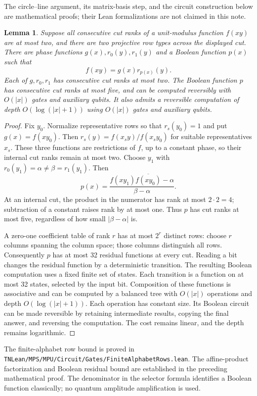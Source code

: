 \documentclass[11pt]{article}
\newtheorem{lemma}{Lemma}
\begin{document}
The circle--line argument, its matrix-basis step, and the circuit
construction below are mathematical proofs; their Lean formalizations
are not claimed in this note.

\begin{lemma}\label{lem:selector}
Suppose all consecutive cut ranks of a unit-modulus function $f(xy)$ are
at most two, and there are two projective row types across the displayed
cut. There are phase functions $g(x),r_0(y),r_1(y)$ and a Boolean function
$p(x)$ such that
\[
 f(xy)=g(x)r_{p(x)}(y).
\]
Each of $g,r_0,r_1$ has consecutive cut ranks at most two.
The Boolean function $p$ has consecutive cut ranks at most five, and
can be computed reversibly with $O(|x|)$ gates and auxiliary qubits.
It also admits a reversible computation of depth $O(\log(|x|+1))$
using $O(|x|)$ gates and auxiliary qubits.
\end{lemma}
\begin{proof}
Fix $y_0$. Normalize representative rows so that $r_s(y_0)=1$ and put
$g(x)=f(xy_0)$. Then $r_s(y)=f(x_s y)/f(x_s y_0)$ for suitable
representatives $x_s$. These three functions are restrictions of $f$,
up to a constant phase, so their internal cut ranks remain at most two.
Choose $y_1$ with $r_0(y_1)=\alpha\ne\beta=r_1(y_1)$. Then
\[
 p(x)=\frac{f(xy_1)\overline{f(xy_0)}-\alpha}{\beta-\alpha}.
\]
At an internal cut, the product in the numerator has rank at most
$2\cdot2=4$; subtraction of a constant raises rank by at most one.
Thus $p$ has cut ranks at most five, regardless of how small
$|\beta-\alpha|$ is.

A zero-one coefficient table of rank $r$ has at most $2^r$ distinct rows:
choose $r$ columns spanning the column space; those columns distinguish
all rows. Consequently $p$ has at most 32 residual functions at every
cut. Reading a bit changes the residual function by a deterministic
transition. The resulting Boolean computation uses a fixed finite set
of states. Each transition is a function on at most 32 states, selected
by the input bit. Composition of these functions is associative and
can be computed by a balanced tree with $O(|x|)$ operations and depth
$O(\log(|x|+1))$. Each operation has constant size. Its Boolean circuit
can be made reversible by retaining intermediate results, copying the
final answer, and reversing the computation. The cost remains linear,
and the depth remains logarithmic.
\end{proof}

The finite-alphabet row bound is proved in
\nolinkurl{TNLean/MPS/MPU/Circuit/Gates/FiniteAlphabetRows.lean}. The affine-product
factorization and Boolean residual bound are established in the preceding
mathematical proof. The denominator in the selector formula identifies a
Boolean function classically; no quantum amplitude amplification is used.
\end{document}
